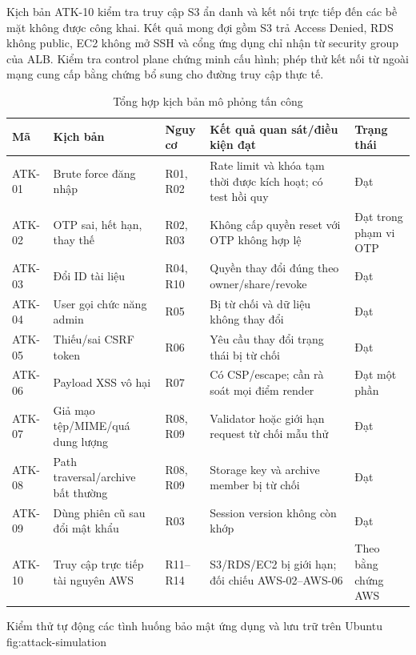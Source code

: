 Kịch bản ATK-10 kiểm tra truy cập S3 ẩn danh và kết nối trực tiếp đến các bề mặt không được công khai. Kết quả mong đợi gồm S3 trả Access Denied, RDS không public, EC2 không mở SSH và cổng ứng dụng chỉ nhận từ security group của ALB. Kiểm tra control plane chứng minh cấu hình; phép thử kết nối từ ngoài mạng cung cấp bằng chứng bổ sung cho đường truy cập thực tế.

\begin{table}[htbp]\centering\scriptsize
\caption{Tổng hợp kịch bản mô phỏng tấn công}
\label{tab:attack-simulation}
\begin{tabularx}{\textwidth}{P{1.25cm}P{3.1cm}P{2.0cm}X P{1.8cm}}\toprule
\textbf{Mã}&\textbf{Kịch bản}&\textbf{Nguy cơ}&\textbf{Kết quả quan sát/điều kiện đạt}&\textbf{Trạng thái}\\\midrule
ATK-01 & Brute force đăng nhập & R01, R02 & Rate limit và khóa tạm thời được kích hoạt; có test hồi quy & Đạt\\
ATK-02 & OTP sai, hết hạn, thay thế & R02, R03 & Không cấp quyền reset với OTP không hợp lệ & Đạt trong phạm vi OTP\\
ATK-03 & Đổi ID tài liệu & R04, R10 & Quyền thay đổi đúng theo owner/share/revoke & Đạt\\
ATK-04 & User gọi chức năng admin & R05 & Bị từ chối và dữ liệu không thay đổi & Đạt\\
ATK-05 & Thiếu/sai CSRF token & R06 & Yêu cầu thay đổi trạng thái bị từ chối & Đạt\\
ATK-06 & Payload XSS vô hại & R07 & Có CSP/escape; cần rà soát mọi điểm render & Đạt một phần\\
ATK-07 & Giả mạo tệp/MIME/quá dung lượng & R08, R09 & Validator hoặc giới hạn request từ chối mẫu thử & Đạt\\
ATK-08 & Path traversal/archive bất thường & R08, R09 & Storage key và archive member bị từ chối & Đạt\\
ATK-09 & Dùng phiên cũ sau đổi mật khẩu & R03 & Session version không còn khớp & Đạt\\
ATK-10 & Truy cập trực tiếp tài nguyên AWS & R11--R14 & S3/RDS/EC2 bị giới hạn; đối chiếu AWS-02--AWS-06 & Theo bằng chứng AWS\\\bottomrule
\end{tabularx}\end{table}

{Kiểm thử tự động các tình huống bảo mật ứng dụng và lưu trữ trên Ubuntu}
{fig:attack-simulation}

